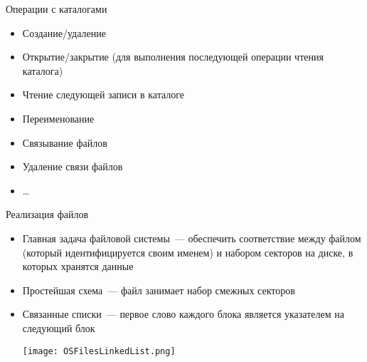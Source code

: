 \documentclass[aspectratio=169,14pt]{beamer}
\begin{document}
\begin{frame}{Операции с каталогами}
    \begin{itemize}
        \item Создание/удаление
        \item Открытие/закрытие (для выполнения последующей операции чтения каталога)
        \item Чтение следующей записи в каталоге
        \item Переименование
        \item Связывание файлов
        \item Удаление связи файлов
        \item \ldots
    \end{itemize}
\end{frame}

\begin{frame}{Реализация файлов}
    \begin{footnotesize}
    \begin{spacing}{0.8}
        \begin{itemize}
            \item Главная задача файловой системы~--- обеспечить соответствие
            между файлом (который идентифицируется своим именем) и набором
            секторов на диске, в которых хранятся данные
            \item Простейшая схема~--- файл занимает набор смежных секторов
            \begin{itemize}
            \end{itemize}
            \item Связанные списки~--- первое слово каждого блока является
            указателем на следующий блок
            \begin{itemize}
            \end{itemize}
            \texttt{[image: OSFilesLinkedList.png]}
        \end{itemize}
    \end{spacing}
    \end{footnotesize}
\end{frame}
\end{document}
